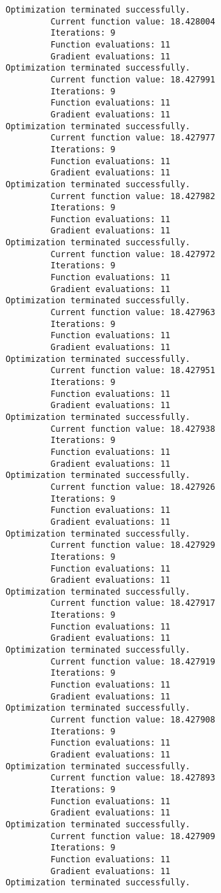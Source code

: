 \documentclass[11pt]{article}
\begin{document}
\begin{Verbatim}[commandchars=\\\{\}]
Optimization terminated successfully.
         Current function value: 18.428004
         Iterations: 9
         Function evaluations: 11
         Gradient evaluations: 11
Optimization terminated successfully.
         Current function value: 18.427991
         Iterations: 9
         Function evaluations: 11
         Gradient evaluations: 11
Optimization terminated successfully.
         Current function value: 18.427977
         Iterations: 9
         Function evaluations: 11
         Gradient evaluations: 11
Optimization terminated successfully.
         Current function value: 18.427982
         Iterations: 9
         Function evaluations: 11
         Gradient evaluations: 11
Optimization terminated successfully.
         Current function value: 18.427972
         Iterations: 9
         Function evaluations: 11
         Gradient evaluations: 11
Optimization terminated successfully.
         Current function value: 18.427963
         Iterations: 9
         Function evaluations: 11
         Gradient evaluations: 11
Optimization terminated successfully.
         Current function value: 18.427951
         Iterations: 9
         Function evaluations: 11
         Gradient evaluations: 11
Optimization terminated successfully.
         Current function value: 18.427938
         Iterations: 9
         Function evaluations: 11
         Gradient evaluations: 11
Optimization terminated successfully.
         Current function value: 18.427926
         Iterations: 9
         Function evaluations: 11
         Gradient evaluations: 11
Optimization terminated successfully.
         Current function value: 18.427929
         Iterations: 9
         Function evaluations: 11
         Gradient evaluations: 11
Optimization terminated successfully.
         Current function value: 18.427917
         Iterations: 9
         Function evaluations: 11
         Gradient evaluations: 11
Optimization terminated successfully.
         Current function value: 18.427919
         Iterations: 9
         Function evaluations: 11
         Gradient evaluations: 11
Optimization terminated successfully.
         Current function value: 18.427908
         Iterations: 9
         Function evaluations: 11
         Gradient evaluations: 11
Optimization terminated successfully.
         Current function value: 18.427893
         Iterations: 9
         Function evaluations: 11
         Gradient evaluations: 11
Optimization terminated successfully.
         Current function value: 18.427909
         Iterations: 9
         Function evaluations: 11
         Gradient evaluations: 11
Optimization terminated successfully.

\end{Verbatim}
\end{document}
